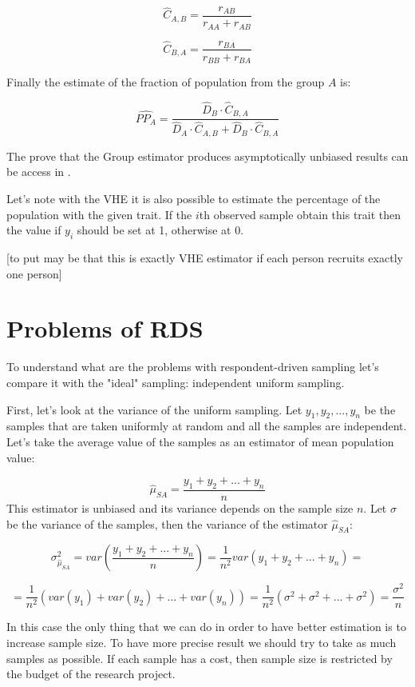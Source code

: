 \documentclass[12pt]{report}
\begin{document}
$$ \widehat{C}_{A, B} = \frac{r_{AB}}{r_{AA} + r_{AB}} $$

$$ \widehat{C}_{B, A} = \frac{r_{BA}}{r_{BB} + r_{BA}} $$

Finally the estimate of the fraction of population from the group $A$ is:

$$ \widehat{PP_A} = \frac{ \widehat{D}_B \cdot \widehat{C}_{B, A}}{ 
\widehat{D}_A \cdot \widehat{C}_{A, B} + \widehat{D}_B \cdot \widehat{C}_{B, A}} $$

The prove that the Group estimator produces asymptotically unbiased results can be access in \cite{salganik2004sampling}.

Let's note with the VHE it is also possible to estimate the percentage of the population with the given trait. If the $i$th observed sample obtain this trait then the value if $y_i$ should be set at 1, otherwise at 0.

[to put may be that this is exactly VHE estimator if each person recruits exactly one person]

\section{Problems of RDS}

To understand what are the problems with respondent-driven sampling let's compare it with the "ideal" sampling: independent uniform sampling.

First, let's look at the variance of the uniform sampling.
Let $y_1, y_2, ..., y_n$ be the samples that are taken uniformly at random and all the samples are independent. Let's take the average value of the samples as an estimator of mean population value:

$$ \widehat{\mu}_{SA} = \frac{y_1 + y_2 + ... + y_n}{n}$$
This estimator is unbiased and its variance depends on the sample size $n$. Let $\sigma$ be the variance of the samples, then the variance of the estimator $ \widehat{\mu}_{SA}$:

$$ \sigma^2_{\hat{\mu}_{SA}} = var\left( \frac{y_1 + y_2 + ... + y_n}{n}\right)=\frac{1}{n^2} var(y_1 + y_2 + ... + y_n) =$$

$$= \frac{1}{n^2} \left(var(y_1) + var(y_2) + ... + var(y_n)\right)=\frac{1}{n^2} \left(\sigma^2 + \sigma^2 + ... + \sigma^2\right) = \frac{\sigma^2}{n}$$

In this case the only thing that we can do in order to have better estimation is to increase sample size. To have more precise result we should try to take as much samples as possible. If each sample has a cost, then sample size is restricted by the budget of the research project. 
\end{document}
